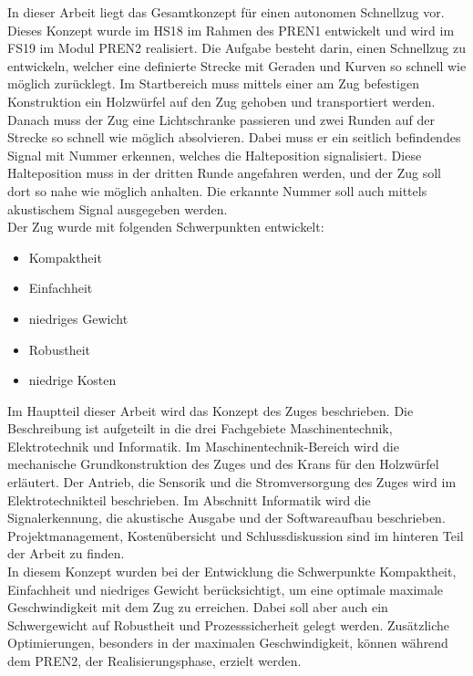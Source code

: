 \documentclass[../../main.tex]{subfiles}
\begin{document}
In dieser Arbeit liegt das Gesamtkonzept für einen autonomen Schnellzug vor. Dieses Konzept wurde im HS18 im Rahmen des PREN1 entwickelt und wird im FS19 im Modul PREN2 realisiert. Die Aufgabe besteht darin, einen Schnellzug zu entwickeln, welcher eine definierte Strecke mit Geraden und Kurven so schnell wie möglich zurücklegt. Im Startbereich muss mittels einer am Zug befestigen Konstruktion ein Holzwürfel auf den Zug gehoben und transportiert werden. Danach muss der Zug eine Lichtschranke passieren und zwei Runden auf der Strecke so schnell wie möglich absolvieren. Dabei muss er ein seitlich befindendes Signal mit Nummer erkennen, welches die Halteposition signalisiert. Diese Halteposition muss in der dritten Runde angefahren werden, und der Zug soll dort so nahe wie möglich anhalten. Die erkannte Nummer soll auch mittels akustischem Signal ausgegeben werden. \\
Der Zug wurde mit folgenden Schwerpunkten entwickelt:
\begin{itemize}
    \item Kompaktheit
    \item Einfachheit
    \item niedriges Gewicht
    \item Robustheit
    \item niedrige Kosten
\end{itemize}
Im Hauptteil dieser Arbeit wird das Konzept des Zuges beschrieben. Die Beschreibung ist aufgeteilt in die drei
Fachgebiete Maschinentechnik, Elektrotechnik und Informatik. Im Maschinentechnik-Bereich wird die mechanische
Grundkonstruktion des Zuges und des Krans für den Holzwürfel erläutert. Der Antrieb, die Sensorik und die
Stromversorgung des Zuges wird im Elektrotechnikteil beschrieben. Im Abschnitt Informatik wird die Signalerkennung, die
akustische Ausgabe und der Softwareaufbau beschrieben. Projektmanagement, Kostenübersicht und Schlussdiskussion sind im hinteren Teil der Arbeit zu finden.\\
In diesem Konzept wurden bei der Entwicklung die Schwerpunkte Kompaktheit, Einfachheit und niedriges Gewicht berücksichtigt, um eine optimale maximale Geschwindigkeit mit dem Zug zu erreichen. Dabei soll aber auch ein Schwergewicht auf Robustheit und Prozesssicherheit gelegt werden. Zusätzliche Optimierungen, besonders in der maximalen Geschwindigkeit, können während dem PREN2, der Realisierungsphase, erzielt werden.
\pagebreak
\end{document}
